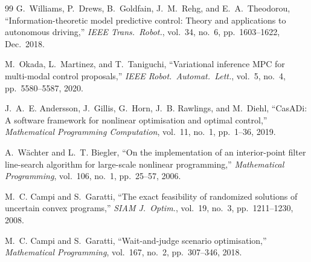 \documentclass[11pt,onecolumn,a4paper]{article}
\begin{document}
\begin{thebibliography}{99}
G.~Williams, P.~Drews, B.~Goldfain, J.~M.~Rehg, and
E.~A.~Theodorou, ``Information-theoretic model predictive control:
Theory and applications to autonomous driving,'' \emph{IEEE Trans.\
Robot.}, vol.~34, no.~6, pp.~1603--1622, Dec.\ 2018.

M.~Okada, L.~Martinez, and T.~Taniguchi, ``Variational inference MPC
for multi-modal control proposals,'' \emph{IEEE Robot.\ Automat.\
Lett.}, vol.~5, no.~4, pp.~5580--5587, 2020.

J.~A.~E. Andersson, J.~Gillis, G.~Horn, J.~B. Rawlings, and M.~Diehl,
``CasADi: A software framework for nonlinear optimisation and
optimal control,'' \emph{Mathematical Programming Computation},
vol.~11, no.~1, pp.~1--36, 2019.

A.~W{\"a}chter and L.~T. Biegler, ``On the implementation of an
interior-point filter line-search algorithm for large-scale nonlinear
programming,'' \emph{Mathematical Programming}, vol.~106, no.~1,
pp.~25--57, 2006.

M.~C. Campi and S.~Garatti, ``The exact feasibility of randomized
solutions of uncertain convex programs,'' \emph{SIAM J.\ Optim.},
vol.~19, no.~3, pp.~1211--1230, 2008.

M.~C. Campi and S.~Garatti, ``Wait-and-judge scenario optimisation,''
\emph{Mathematical Programming}, vol.~167, no.~2, pp.~307--346, 2018.



\end{thebibliography}

\end{document}
